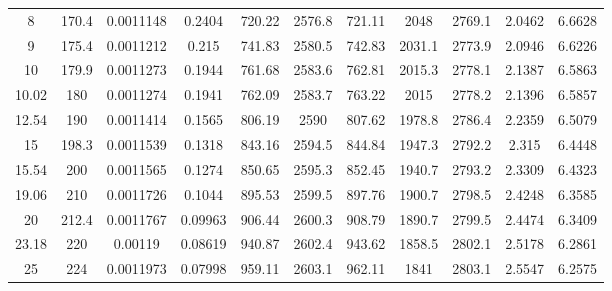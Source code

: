 \begin{longtable}{ccccccccccc}
8        & 170.4       & 0.0011148              & 0.2404              & 720.22                 & 2576.8              & 721.11          & 2048         & 2769.1       & 2.0462         & 6.6628      \\
9        & 175.4       & 0.0011212              & 0.215               & 741.83                 & 2580.5              & 742.83          & 2031.1       & 2773.9       & 2.0946         & 6.6226      \\
10       & 179.9       & 0.0011273              & 0.1944              & 761.68                 & 2583.6              & 762.81          & 2015.3       & 2778.1       & 2.1387         & 6.5863      \\
10.02    & 180         & 0.0011274              & 0.1941              & 762.09                 & 2583.7              & 763.22          & 2015         & 2778.2       & 2.1396         & 6.5857      \\
12.54    & 190         & 0.0011414              & 0.1565              & 806.19                 & 2590                & 807.62          & 1978.8       & 2786.4       & 2.2359         & 6.5079      \\
15       & 198.3       & 0.0011539              & 0.1318              & 843.16                 & 2594.5              & 844.84          & 1947.3       & 2792.2       & 2.315          & 6.4448      \\
15.54    & 200         & 0.0011565              & 0.1274              & 850.65                 & 2595.3              & 852.45          & 1940.7       & 2793.2       & 2.3309         & 6.4323      \\
19.06    & 210         & 0.0011726              & 0.1044              & 895.53                 & 2599.5              & 897.76          & 1900.7       & 2798.5       & 2.4248         & 6.3585      \\
20       & 212.4       & 0.0011767              & 0.09963             & 906.44                 & 2600.3              & 908.79          & 1890.7       & 2799.5       & 2.4474         & 6.3409      \\
23.18    & 220         & 0.00119                & 0.08619             & 940.87                 & 2602.4              & 943.62          & 1858.5       & 2802.1       & 2.5178         & 6.2861      \\
25       & 224         & 0.0011973              & 0.07998             & 959.11                 & 2603.1              & 962.11          & 1841         & 2803.1       & 2.5547         & 6.2575      \\

\end{longtable}
